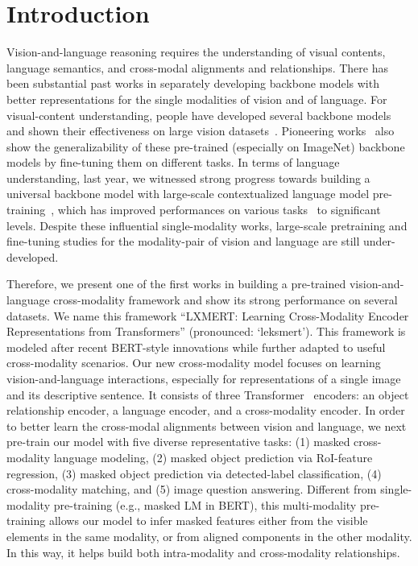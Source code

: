 \documentclass[11pt,a4paper]{article}
\begin{document}
\section{Introduction}
Vision-and-language reasoning requires the understanding of visual contents, language semantics, and cross-modal alignments and relationships.
There has been substantial past works in separately developing backbone models with better representations for the single modalities of vision and of language.
For visual-content understanding, people have developed several backbone models~\cite{simonyan2014very, szegedy2015going, he2016deep}
and shown their effectiveness on large vision datasets~\cite{deng2009imagenet, lin2014microsoft, krishna2017visual}. 
Pioneering works~\cite{girshick2014rich, xu2015show} also show the generalizability of these pre-trained (especially on ImageNet) backbone models by fine-tuning them on different tasks.
In terms of language understanding, last year, we witnessed strong progress towards building a universal backbone model with large-scale contextualized language model pre-training~\cite{peters2018deep, radford2018improving, devlin2018bert}, which has improved performances on various tasks~\cite{rajpurkar2016squad, wang2018glue} to significant levels.
Despite these influential single-modality works, large-scale pretraining and fine-tuning studies for the modality-pair of vision and language are still under-developed. 

Therefore, we present one of the first works in building a pre-trained vision-and-language cross-modality framework and show its strong performance on several datasets. 
We name this framework ``LXMERT: Learning Cross-Modality Encoder Representations from Transformers'' (pronounced: `leksmert'). 
This framework is modeled after recent BERT-style innovations while further adapted to useful cross-modality scenarios.
Our new cross-modality model focuses on learning vision-and-language interactions, especially for representations of a single image and its descriptive sentence.
It consists of three Transformer~\cite{vaswani2017attention} encoders: 
an object relationship encoder, a language encoder, and a cross-modality encoder.
In order to better learn the cross-modal alignments between vision and language, we next pre-train our model with five diverse representative tasks: (1) masked cross-modality language modeling, (2) masked object prediction via RoI-feature regression, (3) masked object prediction via detected-label classification, (4) cross-modality matching, and (5) image question answering.
Different from single-modality pre-training (e.g., masked LM in BERT), this multi-modality pre-training allows our model to infer masked features either from the visible elements in the same modality, or from aligned components in the other modality. 
In this way, it helps build both intra-modality and cross-modality relationships.
\end{document}
